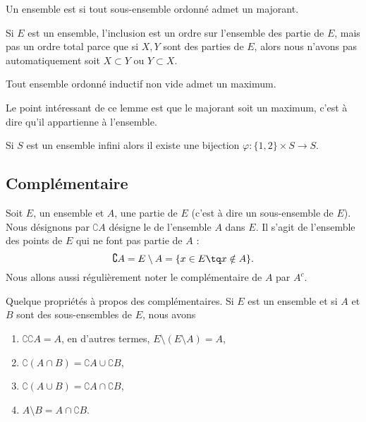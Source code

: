 \begin{definition}  \label{DefGHDfyyz}
    Un ensemble est  si tout sous-ensemble ordonné admet un majorant.
\end{definition}

Si \( E\) est un ensemble, l'inclusion est un ordre sur l'ensemble des partie de \( E\), mais pas un ordre total parce que si \( X,Y\) sont des parties de \( E\), alors nous n'avons pas automatiquement soit \( X\subset Y\) ou \( Y\subset X\).

\begin{lemma}    \label{LemUEGjJBc}
    Tout ensemble ordonné inductif non vide admet un maximum.
\end{lemma}
Le point intéressant de ce lemme est que le majorant soit un maximum, c'est à dire qu'il appartienne à l'ensemble.

\begin{proposition} \label{PropVCSooMzmIX}
    Si \( S\) est un ensemble infini alors il existe une bijection \( \varphi\colon \{ 1,2 \}\times S\to S\).
\end{proposition}

\subsection{Complémentaire}
\label{AppComplement}

Soit $E$, un ensemble et $A$, une partie de $E$ (c'est à dire un sous-ensemble de $E$). Nous désignons par $\complement A$ désigne le  de l'ensemble $A$ dans $E$. Il s'agit de l'ensemble des points de $E$ qui ne font pas partie de $A$ :
\begin{equation}
	\complement A=E\setminus A=\{ x\in E\tq x\notin A \}.
\end{equation}
Nous allons aussi régulièrement noter le complémentaire de \( A\) par \( A^c\).

\begin{lemma}		\label{LemPropsComplement}
	Quelque propriétés à propos des complémentaires. Si $E$ est un ensemble et si $A$ et $B$ sont des sous-ensembles de $E$, nous avons
	\begin{enumerate}
		\item
			$\complement \complement A =A $, en d'autres termes, $E\setminus(E\setminus A)=A$,
		\item
			$\complement(A\cap B)=\complement A\cup\complement B$,
		\item
			$\complement(A\cup B)=\complement A\cap\complement B$,
		\item	\label{ItemLemPropComplementiii}
			$A\setminus B=A\cap\complement B$.
	\end{enumerate}
\end{lemma}

